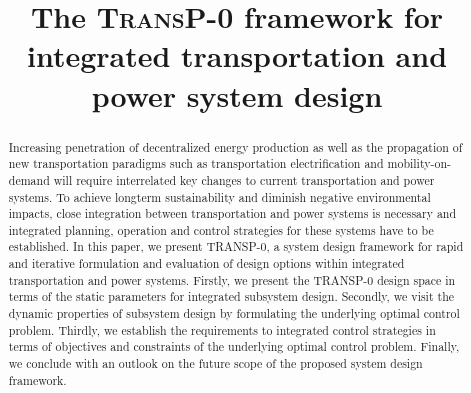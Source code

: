 \title{The \textsc{TransP-0} framework for integrated transportation and power system design}

\author{
	\and
}

\maketitle

\begin{abstract}
	Increasing penetration of decentralized energy production as well as the propagation of new transportation paradigms such as transportation electrification and mobility-on-demand will require interrelated key changes to current transportation and power systems.
	To achieve longterm sustainability and diminish negative environmental impacts, close integration between transportation and power systems is necessary and integrated planning, operation and control strategies for these systems have to be established. In this paper, we present TRANSP-0, a system design framework for rapid and iterative formulation and evaluation of design options within integrated transportation and power systems. Firstly, we present the TRANSP-0 design space in terms of the static parameters for integrated subsystem design. Secondly, we visit the dynamic properties of subsystem design by formulating the underlying optimal control problem. Thirdly, we establish the requirements to integrated control strategies in terms of objectives and constraints of the underlying optimal control problem. Finally, we conclude with an outlook on the future scope of the proposed system design framework.
	
\end{abstract}
